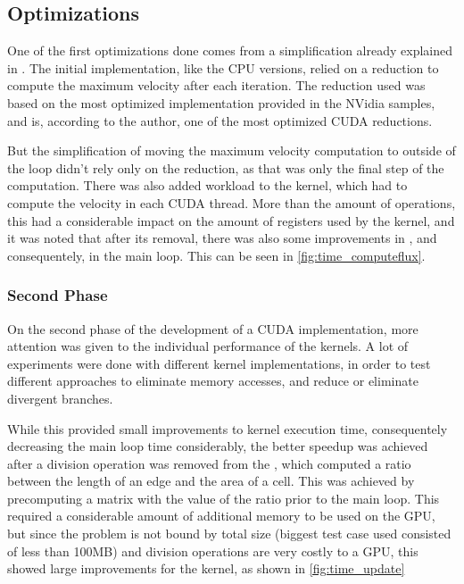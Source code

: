 \subsection{Optimizations}
\label{subsec:cuda:load}

One of the first optimizations done comes from a simplification already explained in . The initial implementation, like the CPU versions, relied on a reduction to compute the maximum velocity after each iteration. The reduction used was based on the most optimized implementation provided in the NVidia samples, and is, according to the author, one of the most optimized CUDA reductions.

But the simplification of moving the maximum velocity computation to outside of the loop didn't rely only on the reduction, as that was only the final step of the computation. There was also added workload to the \computeflux kernel, which had to compute the velocity in each CUDA thread. More than the amount of operations, this had a considerable impact on the amount of registers used by the kernel, and it was noted that after its removal, there was also some improvements in \computeflux, and consequentely, in the main loop. This can be seen in \cref{fig:time_computeflux}.

\subsubsection{Second Phase}
\label{subsubsec:cuda:load:second}

On the second phase of the development of a CUDA implementation, more attention was given to the individual performance of the kernels. A lot of experiments were done with different kernel implementations, in order to test different approaches to eliminate memory accesses, and reduce or eliminate divergent branches.

While this provided small improvements to kernel execution time, consequentely decreasing the main loop time considerably, the better speedup was achieved after a division operation was removed from the \update, which computed a ratio between the length of an edge and the area of a cell. This was achieved by precomputing a matrix with the value of the ratio prior to the main loop. This required a considerable  amount of additional memory to be used on the GPU, but since the problem is not bound by total size (biggest test case used consisted of less than 100MB) and division operations are very costly to a GPU, this showed large improvements for the \update kernel, as shown in \cref{fig:time_update}

